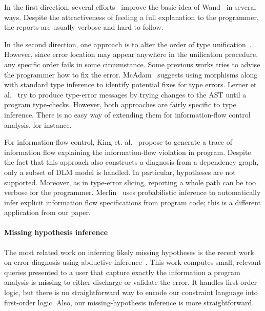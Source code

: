 In the first direction, several efforts~\cite{choppella95,
haack:slicing, tip:slicing} improve the basic idea of
Wand~\cite{wand-errorfinding} in several ways. Despite the
attractiveness of feeding a full explanation to the programmer, the
reports are usually verbose and hard to follow.

In the second direction, one approach is to alter the order of type
unification~\cite{lee:toplas, mcadam:unification}. However, since
error location may appear anywhere in the unification procedure, any
specific order fails in some circumstance. Some previous works tries
to advise the programmer how to fix the error.
McAdam~\cite{mcadam:thesis} suggests using morphisms along with
standard type inference to identify potential fixes for type errors.
Lerner et al.~\cite{lerner:pldi07} try to produce type-error messages
by trying changes to the AST until a program type-checks.  However,
both approaches are fairly specific to type inference. There is no
easy way of extending them for information-flow control analysis, for
instance.

For information-flow control, King et. al.~\cite{king:fse} propose to
generate a trace of information flow explaining the information-flow
violation in program. Despite the fact that this approach also
constructs a diagnosis from a dependency graph, only a subset of DLM
model is handled. In particular, hypotheses are not supported.
Moreover, as in type-error slicing, reporting a whole path can be
too verbose for the programmer.  Merlin~\cite{livshits:merlin} uses
probabilistic inference to automatically infer explicit information
flow specifications from program code; this is a different
application from our paper.

\paragraph{Missing hypothesis inference}

The most related work on inferring likely missing hypotheses is the
recent work on error diagnosis using abductive
inference~\cite{dillig:pldi12}. This work computes small, relevant
queries presented to a user that capture exactly the information a
program analysis is missing to either discharge or validate the error.
It handles first-order logic, but there is no straightforward
way to encode our constraint language into first-order logic.
Also, our missing-hypothesis inference is more straightforward.

